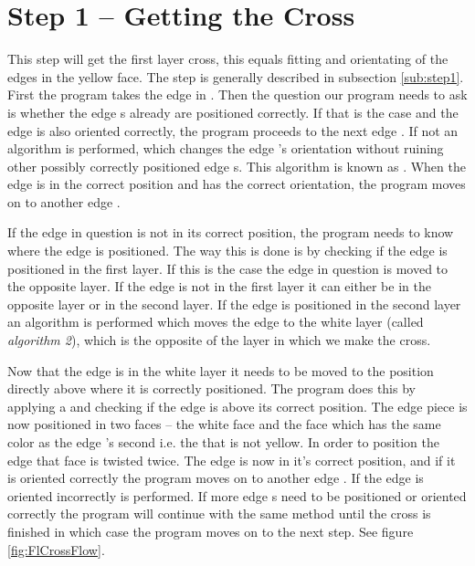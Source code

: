\section{Step 1 -- Getting the Cross}
This step will get the first layer cross, this equals fitting and orientating of the edges in the yellow face. 
The step is generally described in subsection \ref{sub:step1}.
First the program takes the edge \cubie{} in \cubicle{} .
Then the question our program needs to ask is whether the edge \cpiece{}s already are positioned correctly.
If that is the case and the edge \cpiece{} is also oriented correctly, the program proceeds to the next edge \cpiece{}.
If not an algorithm is performed, which changes the edge \cpiece{}'s orientation without ruining other possibly correctly positioned edge \cpiece{}s. 
This algorithm is known as . When the edge \cpiece{} is in the correct position and has the correct orientation, the program moves on to another edge \cpiece{}. 

If the edge \cpiece{} in question is not in its correct position, the program needs to know where the edge is positioned. 
The way this is done is by checking if the edge \cpiece{} is positioned in the first layer. 
If this is the case the edge \cpiece{} in question is moved to the opposite layer. 
If the edge \cpiece{} is not in the first layer it can either be in the opposite layer or in the second layer.
If the edge \cpiece{} is positioned in the second layer an algorithm is performed which moves the edge \cpiece{} to the white layer (called \textit{algorithm 2}), which is the opposite of the layer in which we make the cross.

Now that the edge \cpiece{} is in the white layer it needs to be moved to the position directly above where it is correctly positioned. 
The program does this by applying a  \twist{} and checking if the edge \cpiece{} is above its correct position.
The edge piece is now positioned in two faces -- the white face and the face which has the same color as the edge  \cpiece{}'s second \facelet{} i.e. the \facelet{} that is not yellow.
In order to position the edge \cpiece{} that face is twisted twice.
The edge \cpiece{} is now in it's correct position, and if it is oriented correctly the program moves on to another edge  \cpiece{} .
If the edge \cpiece{} is oriented incorrectly  is performed. If more edge \cpiece{}s need to be positioned or oriented correctly the program will continue with the same method until the cross is finished in which case the program moves on to the next step. See figure \ref{fig:FlCrossFlow}.

